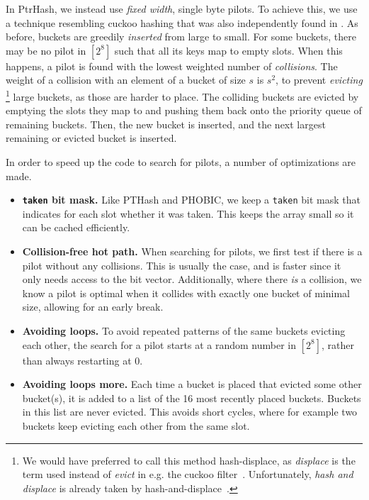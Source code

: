 \documentclass[a4paper,UKenglish,cleveref,thm-restate]{lipics-v2021}
\begin{document}
 In PtrHash, we instead use \emph{fixed width}, single byte pilots. To achieve
this, we use a technique resembling cuckoo hashing \cite{cuckoo-hashing} that
was also independently found in \cite[Section 4.5]{phobic-thesis}.
As before, buckets are greedily \emph{inserted} from large to small. For some buckets,
there may be no pilot in \([2^8]\) such that all its keys map to empty slots. When
this happens, a pilot is found with the lowest weighted number of \emph{collisions}.
The weight of a collision with an element of a bucket of size \(s\) is \(s^2\), to prevent
\emph{evicting}%
\footnote{We would have preferred to call this method hash-displace, as
\emph{displace} is the term used instead of \emph{evict} in e.g. the cuckoo filter~\cite{cuckoo-filter}.
Unfortunately, \emph{hash and displace} is already taken
by hash-and-displace~\cite{hash-displace,chd}.}
large buckets, as those are harder to place.
The colliding buckets are evicted by emptying the slots they map to and
pushing them back onto the priority queue of remaining buckets.
Then, the new bucket is inserted, and the next largest remaining or evicted
bucket is inserted.

 In order to speed up the code to search for pilots, a number of
optimizations are made.
\begin{itemize}
\item \textbf{\texttt{taken} bit mask.} Like PTHash and PHOBIC,
we keep a \texttt{taken} bit mask that indicates for each slot whether it was taken.
This keeps the array small so it can be cached efficiently.
\item \textbf{Collision-free hot path.} When searching for pilots, we first test if there
is a pilot without any collisions. This is usually the case, and is faster
since it only needs access to the bit vector. Additionally, where there
\emph{is} a collision, we know a pilot is optimal when it collides with exactly
one bucket of minimal size, allowing for an early break.
\item \textbf{Avoiding loops.} To avoid repeated patterns of the same buckets evicting
each other, the search for a pilot starts at a random number in \([2^8]\),
rather than always restarting at 0.
\item \textbf{Avoiding loops more.} Each time a bucket is placed that evicted some other
bucket(s), it is added to a list of the 16 most recently placed buckets.
Buckets in this list are never evicted. This avoids short cycles, where for
example two buckets keep evicting each other from the same slot.
\end{itemize}
\end{document}
